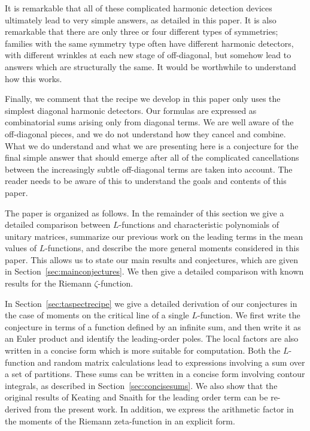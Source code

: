\documentclass[12pt,letterpaper]{amsart}
\theoremstyle{plain}
\theoremstyle{definition}
\theoremstyle{remark}
\numberwithin{equation}{subsection}
\numberwithin{theorem}{subsection}
\numberwithin{table}{subsection}
\begin{document}
        It is remarkable that all of these complicated harmonic detection
devices ultimately lead to very simple answers, as detailed in this paper.
It is also remarkable that there are only three or four different types
of symmetries; families with the same symmetry type often have different
harmonic detectors, with different wrinkles at each new stage of
off-diagonal, but somehow lead to answers which are structurally the same.
It would be worthwhile to understand how this works.

        Finally, we comment that the recipe we develop in this paper only
uses the simplest diagonal harmonic detectors. Our formulas are expressed
as combinatorial sums arising only from diagonal terms. We are well aware
of the off-diagonal pieces, and we do not understand how they
cancel and combine. What we do understand and what we are presenting
here is a conjecture for the final simple answer that should emerge after 
all of the complicated
cancellations between the increasingly subtle off-diagonal terms
are taken into account.
The reader needs to be aware of this to understand the goals and contents
of this paper.


The paper is organized as follows. In the remainder of this section we
give a detailed comparison between $L$-functions and
characteristic polynomials of unitary matrices,
summarize our previous work on the leading terms in the mean values
of $L$-functions,
and
describe the more general moments considered in this
paper.  This allows
us to state our main results and conjectures, which are
given in Section~\ref{sec:mainconjectures}.  We then give a detailed comparison
with known results for the Riemann $\zeta$-function.

In Section~\ref{sec:taspectrecipe} we give a detailed derivation
of our conjectures in the case of moments on 
the critical line
of a single $L$-function.  We first write the conjecture in
terms of a function defined by an infinite sum, and then write
it as an Euler product and identify the leading-order poles.
The local factors are also written in a concise form which
is more suitable for computation.
Both the $L$-function and random matrix calculations lead to
expressions involving a sum over a set of partitions.  These sums
can be written in a concise form involving contour integrals,
as described in Section~\ref{sec:concisesums}.  We also show that the original
results of Keating and Snaith \cite{KS1,KS2} for the leading order
term can be re-derived from the present work.  In addition, we
express the arithmetic factor in the moments of the Riemann
zeta-function in an explicit form.
\end{document}
